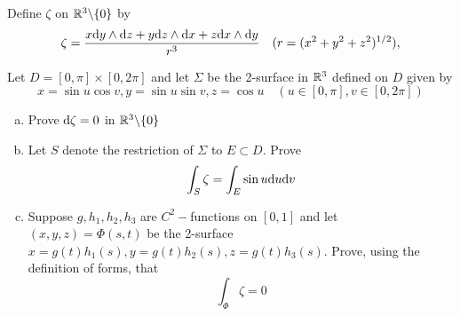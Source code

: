 \documentclass[a4paper, 12pt]{article}
\begin{document}
\begin{problem} [Problem 3]
Define $\zeta$ on $\mathbb{R}^3 \backslash \{0\}$ by \begin{equation*}
\zeta = \frac{x \mathrm{d} y \wedge \mathrm{d} z + y \mathrm{d} z \wedge \mathrm{d} x + z \mathrm{d} x \wedge \mathrm{d} y}{r^3} \quad (r = (x^2 + y^2 + z^2)^{1/2}),
\end{equation*}

Let $D = [0, \pi] \times [0, 2\pi]$ and let $\Sigma$ be the 2-surface in $\mathbb{R}^3$ defined on $D$ given by \begin{equation*}
x = \sin u \cos v, y = \sin u \sin v, z = \cos u \quad (u \in [0, \pi], v \in [0, 2\pi])
\end{equation*}

\begin{enumerate} [(a)]
\item Prove $\mathrm{d} \zeta = 0$ in $\mathbb{R}^3 \backslash \{0\}$
\item Let $S$ denote the restriction of $\Sigma$ to $E \subset D$. Prove \begin{equation*}
\int_S \zeta = \int_E \sin u \mathrm{d} u \mathrm{d} v
\end{equation*}
\item Suppose $g, h_1, h_2, h_3$ are $C^2-$functions on $[0, 1]$ and let $(x, y, z) = \Phi(s, t)$ be the 2-surface $x = g(t)h_1(s), y = g(t) h_2(s), z = g(t) h_3(s)$. Prove, using the definition of forms, that \begin{equation*}
\int_{\Phi} \zeta = 0
\end{equation*}
\end{enumerate}
\end{problem}
\end{document}
